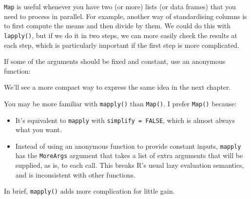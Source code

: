 \texttt{Map} is useful whenever you have two (or more) lists (or data
frames) that you need to process in parallel. For example, another way
of standardising columns is to first compute the means and then divide
by them. We could do this with \texttt{lapply()}, but if we do it in two
steps, we can more easily check the results at each step, which is
particularly important if the first step is more complicated.

\begin{Shaded}
\begin{Highlighting}[]
\StringTok{ }
\StringTok{ }\NormalTok{(}\DataTypeTok{/}

\StringTok{ }\StringTok{ }
\end{Highlighting}
\end{Shaded}

If some of the arguments should be fixed and constant, use an anonymous
function:

\begin{Shaded}
\begin{Highlighting}[]
 
\end{Highlighting}
\end{Shaded}

We'll see a more compact way to express the same idea in the next
chapter.

\begin{shortbox}\begin{minipage}{25pc}

You may be more familiar with \texttt{mapply()} than \texttt{Map()}. I
prefer \texttt{Map()} because:

\begin{itemize}
\item
  It's equivalent to \texttt{mapply} with \texttt{simplify = FALSE},
  which is almost always what you want.
\item
  Instead of using an anonymous function to provide constant inputs,
  \texttt{mapply} has the \texttt{MoreArgs} argument that takes a list
  of extra arguments that will be supplied, as is, to each call. This
  breaks R's usual lazy evaluation semantics, and is inconsistent with
  other functions.
\end{itemize}

In brief, \texttt{mapply()} adds more complication for little gain.

\end{minipage}\end{shortbox}

